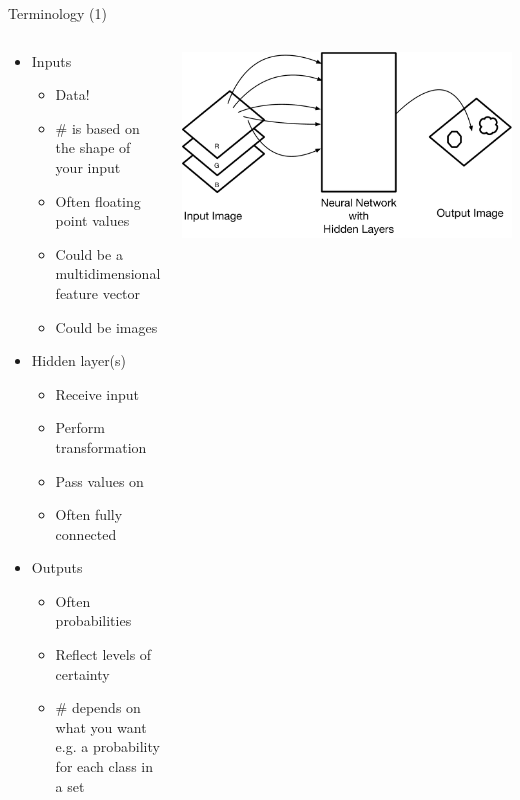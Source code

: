 \documentclass[aspectratio=169]{beamer}
\begin{document}
\begin{frame}{Terminology (1)}

\begin{columns}
\begin{column}{0.6\textwidth}
\begin{itemize}
	\item Inputs
	\begin{itemize}
		\item Data!
		\item \# is based on the shape of your input
                \item Often floating point values
                \item Could be a multidimensional feature vector
                \item Could be images
	\end{itemize}	
	\item Hidden layer(s)
	\begin{itemize}
                \item Receive input
                \item Perform transformation
                \item Pass values on
                \item Often fully connected
	\end{itemize}	
	\item Outputs
	\begin{itemize}
                \item Often probabilities
                \item Reflect levels of certainty %
                \item \# depends on what you want e.g. a probability for each class in a set
	\end{itemize}	
\end{itemize}
\end{column}
\begin{column}{0.4\textwidth}
\includegraphics[width=1\textwidth]{lectFF/inputsAndOutputs.pdf}
\end{column}
\end{columns}

\end{frame}
\end{document}
